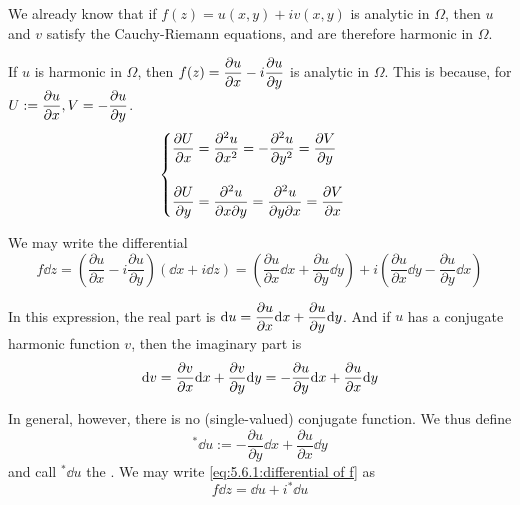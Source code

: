 We already know that if  $ f(z)=u(x,y)+iv(x,y) $ is analytic in  $ \Omega  $, then  $ u $ and  $ v  $ satisfy the Cauchy-Riemann equations, and are therefore harmonic in  $ \Omega $.

If  $ u  $ is harmonic in  $ \Omega  $, then  $ f(z)=\displaystyle\frac{\partial u}{\partial x}-i\frac{\partial u}{\partial y} $ is analytic in  $ \Omega $. This is because, for  $ U:=\displaystyle\frac{\partial u}{\partial x}, V=-\frac{\partial u}{\partial y}$.
\begin{equation}
    \begin{cases}
        \displaystyle\frac{\partial U }{\partial x}=\frac{\partial ^2 u}{\partial x^2}=-\frac{\partial ^2 u}{\partial y^2}=\frac{\partial V}{\partial y}\\
        \\
        
        \displaystyle\frac{\partial U}{\partial y}=\frac{\partial ^2 u}{\partial x\partial y}=\frac{\partial ^2 u}{\partial y\partial x}=\frac{\partial V}{\partial x}
    \end{cases}
\end{equation}

We may write the differential 
\begin{equation}
    f \dd z=\left(\frac{\partial u}{\partial x}-i\frac{\partial u}{\partial y}\right)\left(\dd x+i\dd z\right)=\left(\frac{\partial u}{\partial x}\dd x+\frac{\partial u}{\partial y}\dd y \right)+i\left(\frac{\partial u }{\partial x}\dd y-\frac{\partial u }{\partial y }\dd x\right)\label{eq:5.6.1:differential of f}
\end{equation}

In this expression, the real part is  $ \displaystyle\mathrm{d} u=\frac{\partial u }{\partial x}\mathrm{d} x+\frac{\partial u }{\partial y}\mathrm{d} y $.
And if  $ u  $ has a conjugate harmonic function  $ v $, then the imaginary part is  \[\displaystyle \mathrm{d} v=\frac{\partial v }{\partial x}\mathrm{d} x+\frac{\partial v}{\partial y}\mathrm{d} y=-\frac{\partial u}{\partial y}\mathrm{d} x+\frac{\partial u}{\partial x}\mathrm{d} y  \]

In general, however, there is no (single-valued) conjugate function. We thus define 
\begin{equation}
    {}^*\dd u:=-\frac{\partial u}{\partial y}\dd x+\frac{\partial u}{\partial x}\dd y\label{eq:5.6.1:definition of conjugate differential of du}
\end{equation}
and call  $ {}^*\dd u  $ the . We may write \eqref{eq:5.6.1:differential of f} as 
\begin{equation}
    f\dd z=\dd u+i{}^*\dd u\label{eq:5.6.1:simplication of differential of f}
\end{equation}

